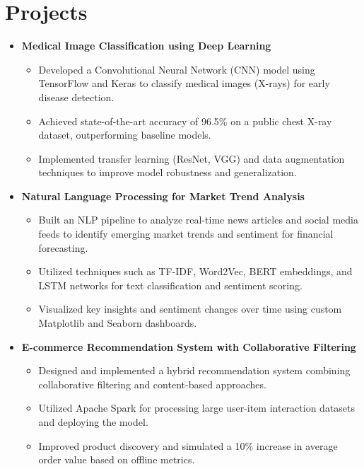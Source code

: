 \documentclass[10pt]{article} %
\newenvironment{resumelist}{
    \begin{itemize}[label=\textbullet, leftmargin=1em, noitemsep, topsep=2pt, parsep=0pt, partopsep=0pt]
}{
    \end{itemize}
}
\begin{document}
\section*{Projects}
\begin{itemize}[leftmargin=*, label={}]
    \item \textbf{Medical Image Classification using Deep Learning}
    \begin{resumelist}
        \item Developed a Convolutional Neural Network (CNN) model using TensorFlow and Keras to classify medical images (X-rays) for early disease detection.
        \item Achieved state-of-the-art accuracy of 96.5\% on a public chest X-ray dataset, outperforming baseline models.
        \item Implemented transfer learning (ResNet, VGG) and data augmentation techniques to improve model robustness and generalization.
    \end{resumelist}
    \vspace{4pt}

    \item \textbf{Natural Language Processing for Market Trend Analysis}
    \begin{resumelist}
        \item Built an NLP pipeline to analyze real-time news articles and social media feeds to identify emerging market trends and sentiment for financial forecasting.
        \item Utilized techniques such as TF-IDF, Word2Vec, BERT embeddings, and LSTM networks for text classification and sentiment scoring.
        \item Visualized key insights and sentiment changes over time using custom Matplotlib and Seaborn dashboards.
    \end{resumelist}
    \vspace{4pt}

    \item \textbf{E-commerce Recommendation System with Collaborative Filtering}
    \begin{resumelist}
        \item Designed and implemented a hybrid recommendation system combining collaborative filtering and content-based approaches.
        \item Utilized Apache Spark for processing large user-item interaction datasets and deploying the model.
        \item Improved product discovery and simulated a 10\% increase in average order value based on offline metrics.
    \end{resumelist}
\end{itemize}
\end{document}
